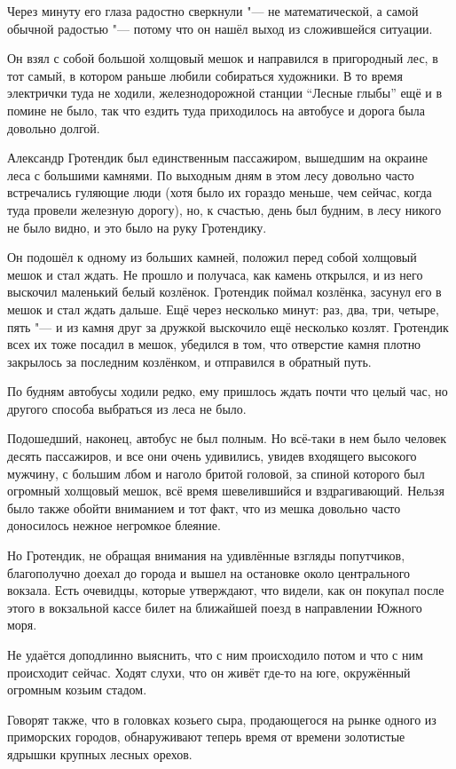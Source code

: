 Через минуту его глаза радостно сверкнули "--- не математической, а самой
обычной радостью "--- потому что он нашёл выход из сложившейся ситуации.

Он взял с собой большой холщовый мешок и направился в пригородный лес, в тот
самый, в котором раньше любили собираться художники.
В то время электрички туда не ходили, железнодорожной станции \enquote{Лесные
глыбы} ещё и в помине не было, так что ездить туда приходилось на автобусе и
дорога была довольно долгой.

Александр Гротендик был единственным пассажиром, вышедшим на окраине леса с
большими камнями.
По выходным дням в этом лесу довольно часто встречались гуляющие люди (хотя было
их гораздо меньше, чем сейчас, когда туда провели железную дорогу), но, к
счастью, день был будним, в лесу никого не было видно, и это было на руку
Гротендику.

Он подошёл к одному из больших камней, положил перед собой холщовый мешок и стал
ждать.
Не прошло и получаса, как камень открылся, и из него выскочил маленький белый
козлёнок.
Гротендик поймал козлёнка, засунул его в мешок и стал ждать дальше.
Ещё через несколько минут: раз, два, три, четыре, пять "--- и из камня друг за
дружкой выскочило ещё несколько козлят.
Гротендик всех их тоже посадил в мешок, убедился в том, что отверстие камня
плотно закрылось за последним козлёнком, и отправился в обратный путь.

По будням автобусы ходили редко, ему пришлось ждать почти что целый час, но
другого способа выбраться из леса не было.

Подошедший, наконец, автобус не был полным.
Но всё-таки в нем было человек десять пассажиров, и все они очень удивились,
увидев входящего высокого мужчину, с большим лбом и наголо бритой головой, за
спиной которого был огромный холщовый мешок, всё время шевелившийся и
вздрагивающий.
Нельзя было также обойти вниманием и тот факт, что из мешка довольно часто
доносилось нежное негромкое блеяние.

Но Гротендик, не обращая внимания на удивлённые взгляды попутчиков, благополучно
доехал до города и вышел на остановке около центрального вокзала.
Есть очевидцы, которые утверждают, что видели, как он покупал после этого в
вокзальной кассе билет на ближайшей поезд в направлении Южного моря.

Не удаётся доподлинно выяснить, что с ним происходило потом и что с ним
происходит сейчас.
Ходят слухи, что он живёт где-то на юге, окружённый огромным козьим стадом.

Говорят также, что в головках козьего сыра, продающегося на рынке одного из
приморских городов, обнаруживают теперь время от времени золотистые ядрышки
крупных лесных орехов.
